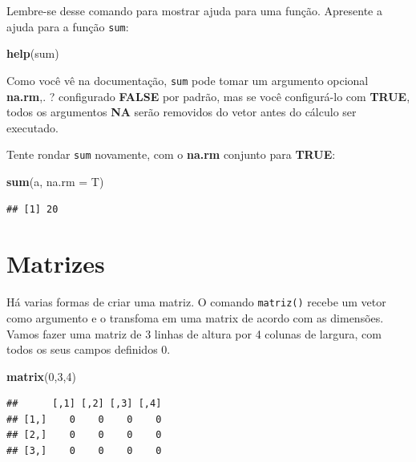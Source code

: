 \documentclass[]{book}
\newenvironment{Shaded}{\begin{snugshade}}{\end{snugshade}}
\newcommand{\DataTypeTok}[1]{\textcolor[rgb]{0.13,0.29,0.53}{#1}}
\newcommand{\DecValTok}[1]{\textcolor[rgb]{0.00,0.00,0.81}{#1}}
\newcommand{\KeywordTok}[1]{\textcolor[rgb]{0.13,0.29,0.53}{\textbf{#1}}}
\newcommand{\NormalTok}[1]{#1}
\begin{document}
Lembre-se desse comando para mostrar ajuda para uma função. Apresente a ajuda para a função \texttt{sum}:

\begin{Shaded}
\begin{Highlighting}[]
\KeywordTok{help}\NormalTok{(sum)}
\end{Highlighting}
\end{Shaded}

Como você vê na documentação, \texttt{sum} pode tomar um argumento opcional \textbf{na.rm},. ? configurado \textbf{FALSE} por padrão, mas se você configurá-lo com \textbf{TRUE}, todos os argumentos \textbf{NA} serão removidos do vetor antes do cálculo ser executado.

Tente rondar \texttt{sum} novamente, com o \textbf{na.rm} conjunto para \textbf{TRUE}:

\begin{Shaded}
\begin{Highlighting}[]
\KeywordTok{sum}\NormalTok{(a, }\DataTypeTok{na.rm =}\NormalTok{ T)}
\end{Highlighting}
\end{Shaded}

\begin{verbatim}
## [1] 20
\end{verbatim}

\hypertarget{matrizes}{%
\section{Matrizes}\label{matrizes}}

Há varias formas de criar uma matriz. O comando \texttt{matriz()} recebe um vetor como argumento e o transfoma em uma matrix de acordo com as dimensões.
Vamos fazer uma matriz de 3 linhas de altura por 4 colunas de largura, com todos os seus campos definidos 0.

\begin{Shaded}
\begin{Highlighting}[]
\KeywordTok{matrix}\NormalTok{(}\DecValTok{0}\NormalTok{,}\DecValTok{3}\NormalTok{,}\DecValTok{4}\NormalTok{)}
\end{Highlighting}
\end{Shaded}

\begin{verbatim}
##      [,1] [,2] [,3] [,4]
## [1,]    0    0    0    0
## [2,]    0    0    0    0
## [3,]    0    0    0    0
\end{verbatim}
\end{document}

